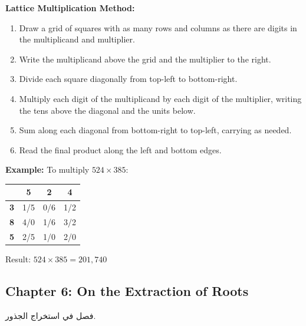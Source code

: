 \documentclass[11pt,a4paper]{article}
\newenvironment{arabicbox}{%
  \begin{framed}
  \begin{minipage}{\linewidth-2\fboxsep-2\fboxrule}
  \setlength{\parindent}{0pt}
  \linespread{1.3}\selectfont
}{%
  \end{minipage}
  \end{framed}
}
\newenvironment{mathalgo}{%
  \par\vspace{0.3cm}
  \begin{framed}
  \setlength{\parindent}{0pt}
}{%
  \end{framed}
  \par\vspace{0.3cm}
}
\begin{document}
\begin{mathalgo}
\textbf{Lattice Multiplication Method:}
\begin{enumerate}[nosep]
  \item Draw a grid of squares with as many rows and columns as there are
  digits in the multiplicand and multiplier.
  \item Write the multiplicand above the grid and the multiplier to the
  right.
  \item Divide each square diagonally from top-left to bottom-right.
  \item Multiply each digit of the multiplicand by each digit of the
  multiplier, writing the tens above the diagonal and the units below.
  \item Sum along each diagonal from bottom-right to top-left, carrying
  as needed.
  \item Read the final product along the left and bottom edges.
\end{enumerate}
\end{mathalgo}

\noindent\textbf{Example:} To multiply $524 \times 385$:

\begin{center}
\begin{tabular}{|c|c|c|c|}
\hline
& \textbf{5} & \textbf{2} & \textbf{4} \\
\hline
\textbf{3} & \multicolumn{1}{c|}{1/5} & \multicolumn{1}{c|}{0/6} & \multicolumn{1}{c|}{1/2} \\
\hline
\textbf{8} & \multicolumn{1}{c|}{4/0} & \multicolumn{1}{c|}{1/6} & \multicolumn{1}{c|}{3/2} \\
\hline
\textbf{5} & \multicolumn{1}{c|}{2/5} & \multicolumn{1}{c|}{1/0} & \multicolumn{1}{c|}{2/0} \\
\hline
\end{tabular}
\end{center}

\noindent Result: $\boxed{524 \times 385 = 201{,}740}$

\subsection{Chapter 6: On the Extraction of Roots}

\begin{arabicbox}
\begin{Arabic}
فصل في استخراج الجذور.
\end{Arabic}
\end{arabicbox}
\end{document}
